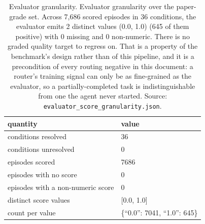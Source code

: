 \begin{table}[tp]
\centering
\caption{Evaluator granularity. Evaluator granularity over the paper-grade set. Across 7,686 scored episodes in 36 conditions, the evaluator emits 2 distinct values (0.0, 1.0) (645 of them positive) with 0 missing and 0 non-numeric. There is no graded quality target to regress on. That is a property of the benchmark's design rather than of this pipeline, and it is a precondition of every routing negative in this document: a router's training signal can only be as fine-grained as the evaluator, so a partially-completed task is indistinguishable from one the agent never started. Source: \texttt{evaluator\_score\_granularity.json}.}
\label{tab:t35}
\footnotesize
\setlength{\tabcolsep}{3pt}
\begin{tabular}{@{}ll@{}}
\toprule
quantity & value \\
\midrule
conditions resolved & 36 \\
conditions unresolved & 0 \\
episodes scored & 7686 \\
episodes with no score & 0 \\
episodes with a non-numeric score & 0 \\
distinct score values & {[}0.0, 1.0{]} \\
count per value & \{``0.0'': 7041, ``1.0'': 645\} \\
\bottomrule
\end{tabular}
\end{table}

